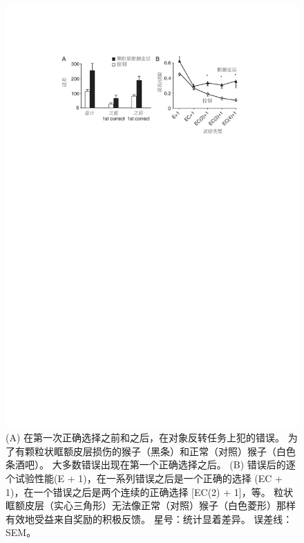 \begin{figure}[!htb]
	\centering
	\includegraphics{chap4/fig_4_8}
	\caption{(A) 在第一次正确选择之前和之后，在对象反转任务上犯的错误。
		为了有颗粒状眶额皮层损伤的猴子（黑条）和正常（对照）猴子（白色条酒吧）。
		大多数错误出现在第一个正确选择之后。
		(B) 错误后的逐个试验性能(E + 1)，在一系列错误之后是一个正确的选择 (EC + 1)，在一个错误之后是两个连续的正确选择 [EC(2) + 1]，等。
		粒状眶额皮层（实心三角形）无法像正常（对照）猴子（白色菱形）那样有效地受益来自奖励的积极反馈。
		星号：统计显着差异。
		误差线：SEM\cite{rudebeck2008amygdala}。}
	\label{fig:fig_4_8}
\end{figure}


